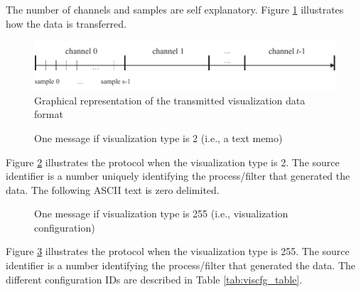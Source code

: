\documentclass[letterpaper,oneside,12pt]{book}
\begin{document}
The number of channels and samples are self explanatory.
Figure \ref{visualization_type1} illustrates how the data is transferred.

\begin{figure}[ht]
 \centerline{\includegraphics{figures/visualization_type1}}
 \caption{Graphical representation of the transmitted visualization data format}
 \label{visualization_type1}
\end{figure}

\begin{figure}[ht]
 \centerline{}
 \caption{One message if visualization type is 2 (i.e., a text memo)}
 \label{visualizationprotocol_type2}
\end{figure}

Figure \ref{visualizationprotocol_type2} illustrates the protocol when the 
visualization type is 2. The source identifier is a number uniquely 
identifying the process/filter that generated the data. The following ASCII
text is zero delimited.

\begin{figure}[ht]
 \centerline{}
 \caption{One message if visualization type is 255 (i.e., visualization configuration)}
 \label{visualizationprotocol_type255}
\end{figure}

Figure \ref{visualizationprotocol_type255} illustrates the protocol when the 
visualization type is 255. The source identifier is a number 
identifying the process/filter that generated the data. The different 
configuration IDs are described in Table \ref{tab:viscfg_table}.
\end{document}
